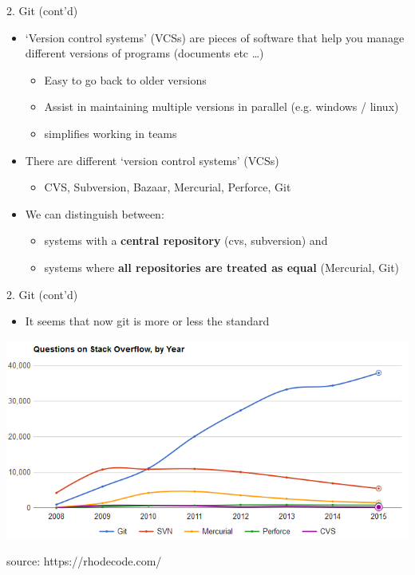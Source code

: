 \documentclass[14pt, aspectratio=169, sectionpage=simple, xclolor=table]{beamer}
\begin{document}
\begin{frame}{2. Git (cont'd)}
\begin{itemize}
\item  `Version control systems' (VCSs) are pieces of software that help you manage different versions of programs (documents etc \ldots)
\begin{itemize}
\item Easy to go back to older versions
\item Assist in maintaining multiple versions in parallel (e.g. windows / linux)
\item simplifies working in teams
\end{itemize}
\item There are different `version control systems' (VCSs)
\begin{itemize}
\item CVS, Subversion, Bazaar, Mercurial, Perforce, Git
\end{itemize}
\item We can distinguish between:
\begin{itemize}
\item systems with a \textbf{central repository} (cvs, subversion) and
\item systems where \textbf{all repositories are treated as equal} (Mercurial, Git)
\end{itemize}

\end{itemize}
\end{frame}

\begin{frame}{2. Git (cont'd)}
\vspace*{-1mm}
\begin{itemize}	
\item It seems that now git is more or less the standard	
\end{itemize}
\begin{center}
\includegraphics[width=0.78\linewidth]{figures/NumberOfQuestions}
\end{center}
{\tiny source: https://rhodecode.com/}
\end{frame}
\end{document}
